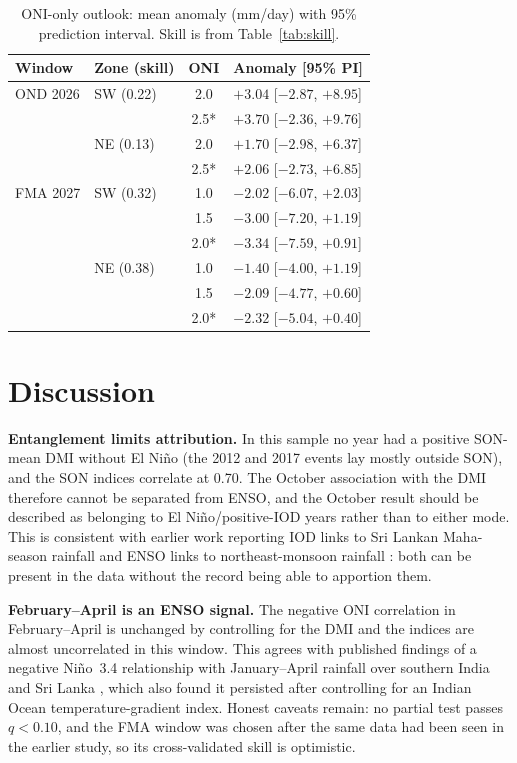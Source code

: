\documentclass{article}
\begin{document}
\begin{table}[t]
\centering
\footnotesize
\setlength{\tabcolsep}{3pt}
\caption{ONI-only outlook: mean anomaly (mm/day) with 95\% prediction interval. Skill is from
Table~\ref{tab:skill}.}
\label{tab:out}
\begin{tabular}{llcl}
\toprule
Window & Zone (skill) & ONI & Anomaly [95\% PI] \\
\midrule
OND 2026 & SW (0.22) & 2.0 & $+3.04$ [$-2.87$, $+8.95$] \\
 & & 2.5* & $+3.70$ [$-2.36$, $+9.76$] \\
 & NE (0.13) & 2.0 & $+1.70$ [$-2.98$, $+6.37$] \\
 & & 2.5* & $+2.06$ [$-2.73$, $+6.85$] \\
FMA 2027 & SW (0.32) & 1.0 & $-2.02$ [$-6.07$, $+2.03$] \\
 & & 1.5 & $-3.00$ [$-7.20$, $+1.19$] \\
 & & 2.0* & $-3.34$ [$-7.59$, $+0.91$] \\
 & NE (0.38) & 1.0 & $-1.40$ [$-4.00$, $+1.19$] \\
 & & 1.5 & $-2.09$ [$-4.77$, $+0.60$] \\
 & & 2.0* & $-2.32$ [$-5.04$, $+0.40$] \\
\bottomrule
\end{tabular}
\end{table}

\section{Discussion}

\textbf{Entanglement limits attribution.} In this sample no year had a positive SON-mean DMI without
El Ni\~{n}o (the 2012 and 2017 events lay mostly outside SON), and the SON indices correlate at 0.70. The October association with the DMI therefore
cannot be separated from ENSO, and the October result should be described as belonging to
El Ni\~{n}o/positive-IOD years rather than to either mode. This is consistent with earlier work
reporting IOD links to Sri Lankan Maha-season rainfall \cite{zubair2003,zubair2008,kajakokulan2025}
and ENSO links to northeast-monsoon rainfall \cite{zubair2006}: both can be present in the data
without the record being able to apportion them.

\textbf{February--April is an ENSO signal.} The negative ONI correlation in February--April is
unchanged by controlling for the DMI and the indices are almost uncorrelated in this window. This
agrees with published findings of a negative Ni\~{n}o~3.4 relationship with January--April
rainfall over southern India and Sri Lanka \cite{vialard2011,lin2026}, which also found it
persisted after controlling for an Indian Ocean temperature-gradient index. Honest caveats remain:
no partial test passes $q<0.10$, and the FMA window was chosen after the same data had been seen in
the earlier study, so its cross-validated skill is optimistic.
\end{document}
